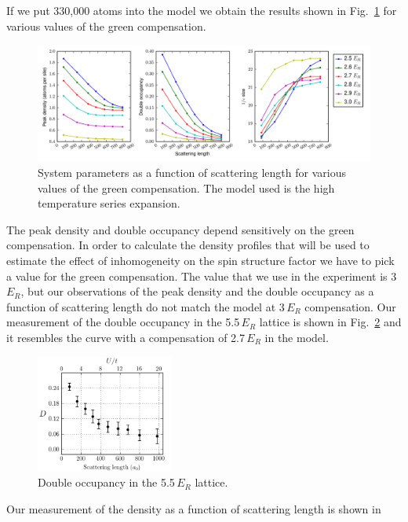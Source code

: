 \documentclass[11pt,letter]{article}
\begin{document}
If we put 330,000 atoms into the model we obtain the results shown in
Fig.~\ref{fig:thermo-green} for various values of the green compensation.  
\begin{figure}
\centering 
\includegraphics[width=\textwidth]{figures_140130/GR.png}
\caption[System parameters in the thermodynamic model]{\small 
System parameters as a function of scattering length for various values of the
green compensation.  The model used is the high temperature series expansion. }
\label{fig:thermo-green} 
\end{figure} 
The peak density and double occupancy depend sensitively on the green
compensation.  In order to calculate the density profiles that will be used to
estimate the effect of inhomogeneity on the spin structure factor we have to
pick a value for the green compensation.  The value that we use in the
experiment is 3\,$E_{R}$, but our observations of the peak density and the
double occupancy as a function of scattering length do not match the model at
3\,$E_{R}$ compensation.  Our measurement of the double occupancy in the
5.5\,$E_{R}$ lattice is shown in Fig.~\ref{fig:docc-5.5} and it resembles the
curve with a compensation of 2.7\,$E_{R}$ in the model.  
\begin{figure}
\centering 
\includegraphics[width=0.4\textwidth]{figures_140130/insitu_D.png}
\caption[Double occupancy]{\small 
Double occupancy in the 5.5\,$E_{R}$ lattice. }
\label{fig:docc-5.5} 
\end{figure} 
 Our measurement of the density as a function of scattering length is shown in
\end{document}
